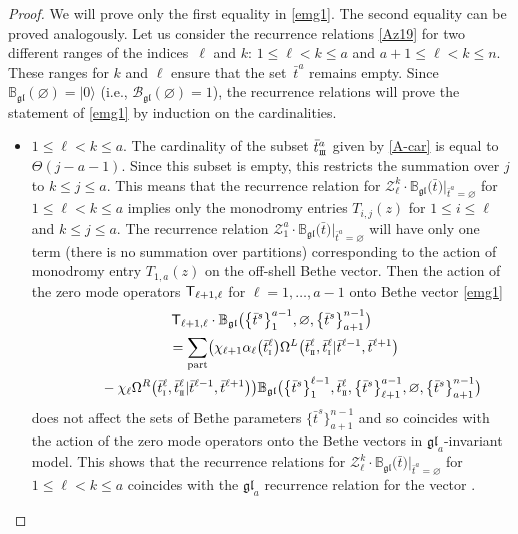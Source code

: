 \documentclass[10pt,a4paper]{amsart}
\newcommand{\so}{\scriptscriptstyle \rm I}
\newcommand{\st}{\scriptscriptstyle \rm I\hspace{-1pt}I}
\newcommand{\sth}{\scriptscriptstyle \rm I\hspace{-1pt}I\hspace{-1pt}I}
\newcommand{\bt}{{\bar t}}
\theoremstyle{definition}
\def\r#1{\eqref{#1}}
\def\sT{{\sf T}}
\def\rvec{|0\rangle}
\def\BBg{\mathbb{B}_{\mathfrak{gl}}}
\def\cBg{\mathcal{B}_{\mathfrak{gl}}}
\def\vk{\chi}
\def\Z{\mathcal{Z}}
\def\Oml{\Omega^L}
\def\Omr{\Omega^R}
\begin{document}
\begin{proof}
We will prove only the first equality in \r{emg1}. The second equality can be proved analogously.
Let us consider the recurrence
relations \r{Az19} for two different ranges of the indices~$\ell$ and $k$:
$1\leq \ell<k\leq a$ and $a+1\leq \ell<k\leq n$.
These ranges for $k$ and $\ell$ ensure that the set~$\bt^a$ remains empty.
Since $\BBg(\varnothing)=\rvec$ (i.e., $\cBg(\varnothing)=1$), the recurrence relations will prove the statement of \eqref{emg1} by induction on the cardinalities.
\begin{itemize}\itemsep=0pt
\item $1\leq \ell<k\leq a$.
The cardinality of the subset $\bt^a_{\sth}$ given by \r{A-car}
is equal to $\Theta(j-a-1)$. Since
this subset is empty, this restricts the summation
over $j$ to $k\leq j\leq a$. This means that the recurrence relation
for $\Z^k_\ell\cdot
\BBg\bigl(\bt\bigr)|_{\bt^a=\varnothing}$ for $1\leq \ell<k\leq a$
implies only the monodromy entries $T_{i,j}(z)$ for $1\leq i\leq \ell$ and
$k\leq j\leq a$. The recurrence relation $\Z^a_{1}\cdot
\BBg\bigl(\bt\bigr)|_{\bt^a=\varnothing}$ will have only one term (there is no summation over
partitions) corresponding to the action of
monodromy entry $T_{1,a}(z)$ on the off-shell Bethe vector.
Then the action of the zero mode operators $\sT_{\ell+1,\ell}$ for
$\ell=1,\dots,a-1$ onto Bethe vector \r{emg1}
\begin{gather*}
\sT_{\ell+1,\ell}\cdot\BBg\bigl(\bigl\{\bt^s\bigr\}_1^{a-1},\varnothing,\bigl\{\bt^s\bigr\}_{a+1}^{n-1}\bigr)\\
\qquad=
\sum_{\rm part}\bigl(\vk_{\ell+1} \alpha_\ell\bigl(\bt^\ell_{\so}\bigr)
\Oml\bigl(\bt^\ell_{\st},\bt^\ell_{\so}|\bt^{\ell-1},\bt^{\ell+1}\bigr)\\
\phantom{\qquad=}{}-\vk_\ell \Omr\bigl(\bt^\ell_{\so},\bt^\ell_{\st}|\bt^{\ell-1},\bt^{\ell+1}\bigr)\bigr)
\BBg\bigl(\bigl\{\bt^s\bigr\}_1^{\ell-1},\bt^\ell_{\st},\bigl\{\bt^s\bigr\}_{\ell+1}^{a-1},
\varnothing,\bigl\{\bt^s\bigr\}_{a+1}^{n-1}\bigr)
\end{gather*}
does not affect the sets of Bethe parameters $\bigl\{\bt^s\bigr\}_{a+1}^{n-1}$
and so coincides with the action of the zero mode operators
onto the Bethe vectors in $\mathfrak{gl}_{a}$-invariant model.
This shows that the recurrence relations for $\Z^k_\ell\cdot
\BBg\bigl(\bt\bigr)|_{\bt^a=\varnothing}$ for $1\leq \ell< k\leq a$
 coincides with the $\mathfrak{gl}_{a}$ recurrence relation for the vector
\smash{$\BBg\bigl(\bigl\{\bt\bigr\}\raisebox{-1pt}{${\vphantom{\big|}}_1^{a-1}$}\bigr)$}.


\end{itemize}
\end{proof}
\end{document}
